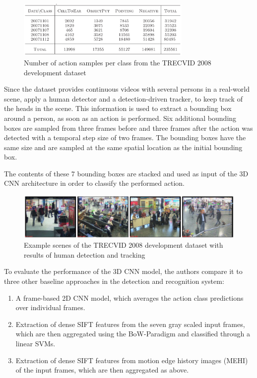 \begin{figure}[H]
    \centering
    \includegraphics[width=0.75\textwidth]{img_deep/3dconv_dataset}
    \caption{Number of action samples per class from the TRECVID 2008 development dataset \cite{ji_3d_2013}}
    \label{fig:3dconv_dataset}
\end{figure}

Since the dataset provides continuous videos with several persons in a real-world scene, \textcite{ji_3d_2013} apply a human detector and a detection-driven tracker, to keep track of the heads in the scene.
This information is used to extract a bounding box around a person, as soon as an action is performed. 
Six additional bounding boxes are sampled from three frames before and three frames after the action was detected with a temporal step size of two frames.
The bounding boxes have the same size and are sampled at the same spatial location as the initial bounding box.

The contents of these 7 bounding boxes are stacked and used as input of the 3D CNN architecture in order to classify the performed action.

\begin{figure}[H]
    \centering
    \includegraphics[width=\textwidth]{img_deep/3dconv_sampletracking}
    \caption{Example scenes of the TRECVID 2008 development dataset with results of human detection and tracking \cite{ji_3d_2013}}
    \label{fig:3dconv_sampletracking}
\end{figure}

To evaluate the performance of the 3D CNN model, the authors compare it to three other baseline approaches in the detection and recognition system:
\begin{enumerate}
    \item A frame-based 2D CNN model, which averages the action class predictions over individual frames.
    \item Extraction of dense SIFT features \cite{lowe_distinctive_2004} from the seven gray scaled input frames, which are then aggregated using the BoW-Paradigm and classified through a linear SVMs.
    \item Extraction of dense SIFT features \cite{lowe_distinctive_2004} from motion edge history images (MEHI)\cite{yang_human_2009} of the input frames, which are then aggregated as above.
\end{enumerate}

